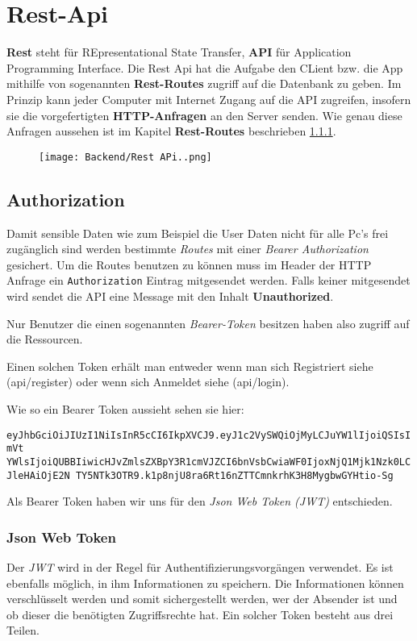 \section{Rest-Api}
\label{restapi}

\textbf{Rest} steht für REpresentational State Transfer, \textbf{API} für Application
Programming Interface. Die Rest Api hat die Aufgabe den CLient bzw. die App
mithilfe von sogenannten \textbf{Rest-Routes} zugriff auf die Datenbank zu geben.
Im Prinzip kann jeder Computer mit Internet Zugang auf die API zugreifen, insofern
sie die vorgefertigten \textbf{HTTP-Anfragen} an den Server senden. Wie genau diese
Anfragen aussehen ist im Kapitel \textbf{Rest-Routes} beschrieben \ref*{}.

\begin{figure}[H]
    \begin{center}
        \texttt{[image: Backend/Rest APi..png]}
    \end{center}
\end{figure}


\subsection{Authorization}

Damit sensible Daten wie zum Beispiel die User Daten nicht für
alle Pc's frei zugänglich sind werden bestimmte \textit{Routes} mit einer
\textit{Bearer Authorization} gesichert. Um die Routes benutzen zu können muss
im Header der HTTP Anfrage ein \texttt{Authorization} Eintrag mitgesendet werden.
Falls keiner mitgesendet wird sendet die API eine Message mit den Inhalt
\textbf{Unauthorized}.

Nur Benutzer die einen sogenannten \textit{Bearer-Token} besitzen haben also zugriff
auf die Ressourcen.

Einen solchen Token erhält man entweder wenn man sich Registriert siehe (api/register) oder wenn sich
Anmeldet siehe (api/login).

Wie so ein Bearer Token aussieht sehen sie hier:

\texttt{eyJhbGciOiJIUzI1NiIsInR5cCI6IkpXVCJ9.eyJ1c2VySWQiOjMyLCJuYW1lIjoiQSIsImVt
    YWlsIjoiQUBBIiwicHJvZmlsZXBpY3R1cmVJZCI6bnVsbCwiaWF0IjoxNjQ1Mjk1Nzk0LCJleHAiOjE2N
    TY5NTk3OTR9.k1p8njU8ra6Rt16nZTTCmnkrhK3H8MygbwGYHtio-Sg}

Als Bearer Token haben wir uns für den \textit{Json Web Token (JWT)} entschieden.

\subsubsection{Json Web Token}
Der \textit{JWT} wird in der Regel für Authentifizierungsvorgängen verwendet. Es ist ebenfalls
möglich, in ihm Informationen zu speichern. Die Informationen können verschlüsselt werden
und somit sichergestellt werden, wer der Absender ist und ob dieser die benötigten Zugriffsrechte
hat. Ein solcher Token besteht aus drei Teilen.

